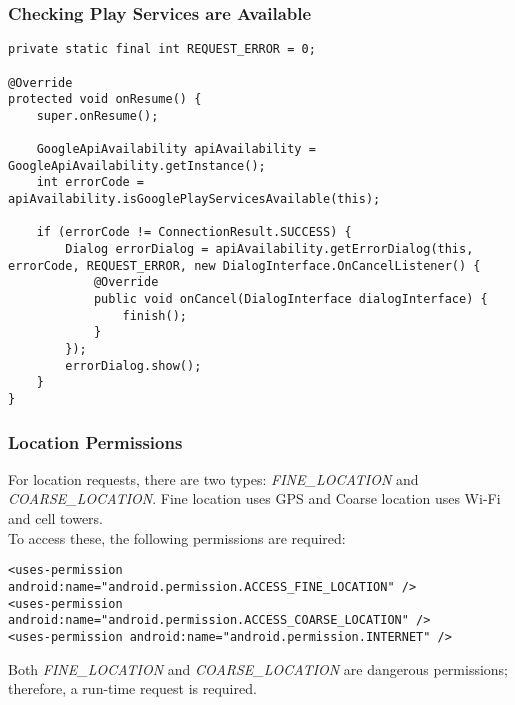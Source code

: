 \documentclass[]{article}
\renewcommand{\it}[1]{\textit{#1}}
\begin{document}
\subsubsection{Checking Play Services are Available} 
\begin{lstlisting}
private static final int REQUEST_ERROR = 0;

@Override
protected void onResume() {
	super.onResume();
	
	GoogleApiAvailability apiAvailability = GoogleApiAvailability.getInstance();
	int errorCode = apiAvailability.isGooglePlayServicesAvailable(this);
	
	if (errorCode != ConnectionResult.SUCCESS) {
		Dialog errorDialog = apiAvailability.getErrorDialog(this, errorCode, REQUEST_ERROR, new DialogInterface.OnCancelListener() {
			@Override
			public void onCancel(DialogInterface dialogInterface) {
				finish();
			}
		});
		errorDialog.show();
	}
}
\end{lstlisting}

\subsubsection{Location Permissions}
For location requests, there are two types: \it{FINE\_LOCATION} and \it{COARSE\_LOCATION}. 
Fine location uses GPS and Coarse location uses Wi-Fi and cell towers.
\\
To access these, the following permissions are required:
\begin{lstlisting}
<uses-permission android:name="android.permission.ACCESS_FINE_LOCATION" />
<uses-permission android:name="android.permission.ACCESS_COARSE_LOCATION" />
<uses-permission android:name="android.permission.INTERNET" />
\end{lstlisting}
Both \it{FINE\_LOCATION} and \it{COARSE\_LOCATION} are dangerous permissions; therefore, a run-time request is required.
\end{document}
